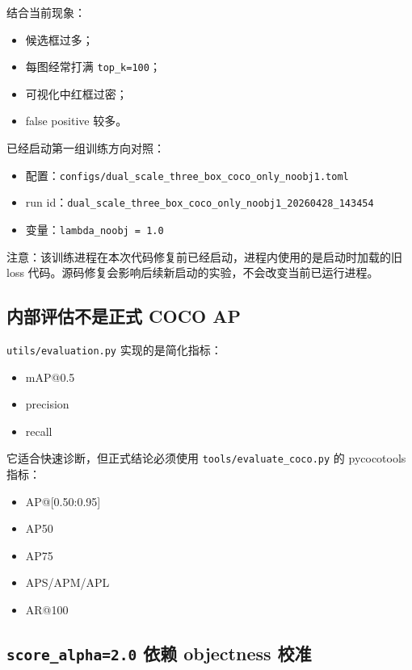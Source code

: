 \documentclass[UTF8]{ctexart}
\begin{document}
结合当前现象：

\begin{itemize}[leftmargin=2em]
  \item 候选框过多；
  \item 每图经常打满 \texttt{top\_k=100}；
  \item 可视化中红框过密；
  \item false positive 较多。
\end{itemize}

已经启动第一组训练方向对照：

\begin{itemize}[leftmargin=2em]
  \item 配置：\texttt{configs/dual\_scale\_three\_box\_coco\_only\_noobj1.toml}
  \item run id：\texttt{dual\_scale\_three\_box\_coco\_only\_noobj1\_20260428\_143454}
  \item 变量：\texttt{lambda\_noobj = 1.0}
\end{itemize}

注意：该训练进程在本次代码修复前已经启动，进程内使用的是启动时加载的旧 loss 代码。源码修复会影响后续新启动的实验，不会改变当前已运行进程。

\subsection{内部评估不是正式 COCO AP}

\texttt{utils/evaluation.py} 实现的是简化指标：

\begin{itemize}[leftmargin=2em]
  \item mAP@0.5
  \item precision
  \item recall
\end{itemize}

它适合快速诊断，但正式结论必须使用 \texttt{tools/evaluate\_coco.py} 的 pycocotools 指标：

\begin{itemize}[leftmargin=2em]
  \item AP@[0.50:0.95]
  \item AP50
  \item AP75
  \item APS/APM/APL
  \item AR@100
\end{itemize}

\subsection{\texttt{score\_alpha=2.0} 依赖 objectness 校准}
\end{document}
